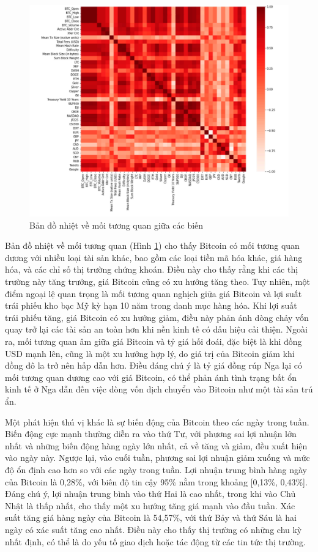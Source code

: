 \newpage

\begin{figure}[h]
    \centering
    \includegraphics[width=\textwidth]{images/heatmap.png}
    \caption{Bản đồ nhiệt về mối tương quan giữa các biến}
    \label{fig:corr}
\end{figure}


Bản đồ nhiệt về mối tương quan (Hình \ref{fig:corr}) cho thấy Bitcoin có mối tương quan dương với nhiều loại tài sản khác, bao gồm các loại tiền mã hóa khác, giá hàng hóa, và các chỉ số thị trường chứng khoán. Điều này cho thấy rằng khi các thị trường này tăng trưởng, giá Bitcoin cũng có xu hướng tăng theo. Tuy nhiên, một điểm ngoại lệ quan trọng là mối tương quan nghịch giữa giá Bitcoin và lợi suất trái phiếu kho bạc Mỹ kỳ hạn 10 năm trong danh mục hàng hóa. Khi lợi suất trái phiếu tăng, giá Bitcoin có xu hướng giảm, điều này phản ánh dòng chảy vốn quay trở lại các tài sản an toàn hơn khi nền kinh tế có dấu hiệu cải thiện. Ngoài ra, mối tương quan âm giữa giá Bitcoin và tỷ giá hối đoái, đặc biệt là khi đồng USD mạnh lên, cũng là một xu hướng hợp lý, do giá trị của Bitcoin giảm khi đồng đô la trở nên hấp dẫn hơn. Điều đáng chú ý là tỷ giá đồng rúp Nga lại có mối tương quan dương cao với giá Bitcoin, có thể phản ánh tình trạng bất ổn kinh tế ở Nga dẫn đến việc dòng vốn dịch chuyển vào Bitcoin như một tài sản trú ẩn.

Một phát hiện thú vị khác là sự biến động của Bitcoin theo các ngày trong tuần. Biến động cực mạnh thường diễn ra vào thứ Tư, với phương sai lợi nhuận lớn nhất và những biến động hàng ngày lớn nhất, cả về tăng và giảm, đều xuất hiện vào ngày này. Ngược lại, vào cuối tuần, phương sai lợi nhuận giảm xuống và mức độ ổn định cao hơn so với các ngày trong tuần. Lợi nhuận trung bình hàng ngày của Bitcoin là 0,28\%, với biên độ tin cậy 95\% nằm trong khoảng [0,13\%, 0,43\%]. Đáng chú ý, lợi nhuận trung bình vào thứ Hai là cao nhất, trong khi vào Chủ Nhật là thấp nhất, cho thấy một xu hướng tăng giá mạnh vào đầu tuần. Xác suất tăng giá hàng ngày của Bitcoin là 54,57\%, với thứ Bảy và thứ Sáu là hai ngày có xác suất tăng cao nhất. Điều này cho thấy thị trường có những chu kỳ nhất định, có thể là do yếu tố giao dịch hoặc tác động từ các tin tức thị trường.

